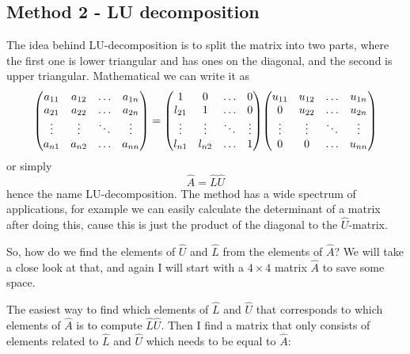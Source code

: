 \documentclass{scrartcl}
\begin{document}
\subsection{Method 2 - LU decomposition}
The idea behind LU-decomposition is to split the matrix into two parts, where the first one is lower triangular and has ones on the diagonal, and the second is upper triangular. Mathematical we can write it as
\begin{equation*}
\mqty(a_{11}&a_{12}&\hdots&a_{1n}\\
	  a_{21}&a_{22}&\hdots&a_{2n}\\
	  \vdots&\vdots&\ddots&\vdots\\
	  a_{n1}&a_{n2}&\hdots&a_{nn})=
\mqty(1&0&\hdots&0\\
	  l_{21}&1&\hdots&0\\
	  \vdots&\vdots&\ddots&\vdots\\
	  l_{n1}&l_{n2}&\hdots&1)
\mqty(u_{11}&u_{12}&\hdots&u_{1n}\\
	  0&u_{22}&\hdots&u_{2n}\\
	  \vdots&\vdots&\ddots&\vdots\\
	  0&0&\hdots&u_{nn})
\end{equation*}
or simply
\begin{equation*}
\hat{A}=\hat{L}\hat{U}
\end{equation*}
hence the name LU-decomposition. The method has a wide spectrum of applications, for example we can easily calculate the determinant of a matrix after doing this, cause this is just the product of the diagonal to the $\hat{U}$-matrix. \par\vspace{3mm}
So, how do we find the elements of $\hat{U}$ and $\hat{L}$ from the elements of $\hat{A}$? We will take a close look at that, and again I will start with a $4\times4$ matrix $\hat{A}$ to save some space.\par\vspace{3mm}
The easiest way to find which elements of $\hat{L}$ and $\hat{U}$ that corresponds to which elements of $\hat{A}$ is to compute $\hat{L}\hat{U}$. Then I find a matrix that only consists of elements related to $\hat{L}$ and $\hat{U}$ which needs to be equal to $\hat{A}$:
\end{document}
